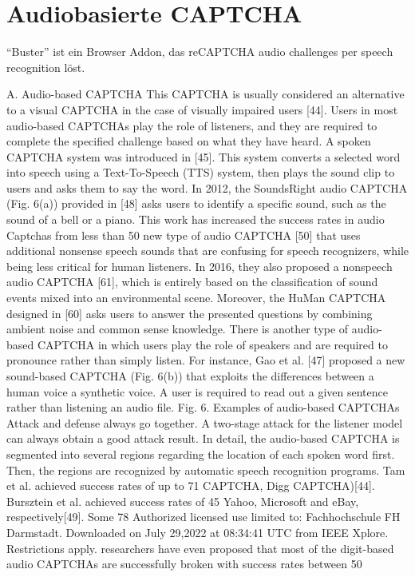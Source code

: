 \section{Audiobasierte CAPTCHA}

“Buster” ist ein Browser Addon, das reCAPTCHA audio challenges per speech recognition löst.


A. Audio-based CAPTCHA
This CAPTCHA is usually considered an alternative to a
visual CAPTCHA in the case of visually impaired users [44].
Users in most audio-based CAPTCHAs play the role of
listeners, and they are required to complete the specified
challenge based on what they have heard. A spoken
CAPTCHA system was introduced in [45]. This system
converts a selected word into speech using a Text-To-Speech
(TTS) system, then plays the sound clip to users and asks them
to say the word. In 2012, the SoundsRight audio CAPTCHA
(Fig. 6(a)) provided in [48] asks users to identify a specific
sound, such as the sound of a bell or a piano. This work has
increased the success rates in audio Captchas from less than
50%
new type of audio CAPTCHA [50] that uses additional
nonsense speech sounds that are confusing for speech
recognizers, while being less critical for human listeners. In
2016, they also proposed a nonspeech audio CAPTCHA [61],
which is entirely based on the classification of sound events
mixed into an environmental scene. Moreover, the HuMan
CAPTCHA designed in [60] asks users to answer the
presented questions by combining ambient noise and common
sense knowledge. There is another type of audio-based
CAPTCHA in which users play the role of speakers and are
required to pronounce rather than simply listen. For instance,
Gao et al. [47] proposed a new sound-based CAPTCHA (Fig.
6(b)) that exploits the differences between a human voice a
synthetic voice. A user is required to read out a given sentence
rather than listening an audio file.
Fig. 6. Examples of audio-based CAPTCHAs
Attack and defense always go together. A two-stage attack
for the listener model can always obtain a good attack result.
In detail, the audio-based CAPTCHA is segmented into
several regions regarding the location of each spoken word
first. Then, the regions are recognized by automatic speech
recognition programs. Tam et al. achieved success rates of up
to 71%
CAPTCHA, Digg CAPTCHA)[44]. Bursztein et al. achieved
success rates of 45%
Yahoo, Microsoft and eBay, respectively[49]. Some
78
Authorized licensed use limited to: Fachhochschule FH Darmstadt. Downloaded on July 29,2022 at 08:34:41 UTC from IEEE Xplore. Restrictions apply.
researchers have even proposed that most of the digit-based
audio CAPTCHAs are successfully broken with success rates
between 50%

